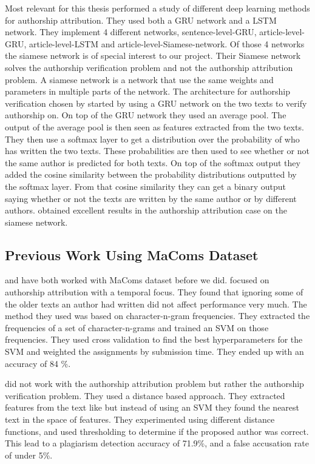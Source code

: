 Most relevant for this thesis \citet{qian:2018} performed a study of different
deep learning methods for authorship attribution. They used both a \gls{GRU}
network and a \gls{LSTM} network. They implement 4 different networks,
sentence-level-\gls{GRU}, article-level-\gls{GRU}, article-level-\gls{LSTM} and
article-level-Siamese-network. Of those 4 networks the siamese network is of
special interest to our project. Their Siamese network solves the authorship
verification problem and not the authorship attribution problem. A siamese
network is a network that use the same weights and parameters in multiple
parts of the network. The architecture for authorship verification chosen by
\citet{qian:2018} started by using a \gls{GRU} network on the two texts to
verify authorship on. On top of the \gls{GRU} network they used an average
pool. The output of the average pool is then seen as features extracted from
the two texts. They then use a softmax layer to get a distribution over the
probability of who has written the two texts. These probabilities are then used
to see whether or not the same author is predicted for both texts. On top of
the softmax output they added the cosine similarity between the probability
distributions outputted by the softmax layer. From that cosine similarity they
can get a binary output saying whether or not the texts are written by the same
author or by different authors. \citet{qian:2018} obtained excellent results in
the authorship attribution case on the siamese network.


\subsection{Previous Work Using MaComs Dataset}
\label{subsec:previous_work_using_macoms_dataset}

\citet{hansen2014} and \citet{aalykke2016} have both worked with MaComs dataset
before we did. \citet{hansen2014} focused on authorship attribution with a
temporal focus. They found that ignoring some of the older texts an author had
written did not affect performance very much. The method they used was based
on character-n-gram frequencies. They extracted the frequencies of a set of
character-n-grams and trained an \gls{SVM} on those frequencies. They used cross
validation to find the best hyperparameters for the \gls{SVM} and weighted the
assignments by submission time. They ended up with an accuracy of 84 \%.

\citet{aalykke2016} did not work with the authorship attribution problem but
rather the authorship verification problem. They used a distance based approach.
They extracted features from the text like \citet{hansen2014} but instead
of using an \gls{SVM} they found the nearest text in the space of features.
They experimented using different distance functions, and used thresholding
to determine if the proposed author was correct. This lead to a plagiarism
detection accuracy of 71.9\%, and a false accusation rate of under 5\%.

